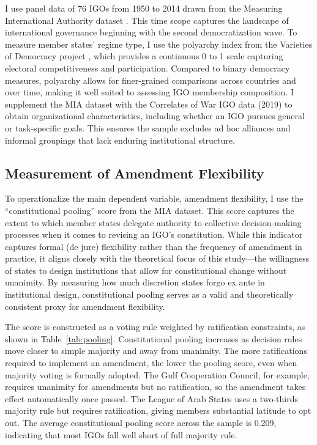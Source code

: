 \documentclass[12pt]{article}
\begin{document}
I use panel data of 76 IGOs from 1950 to 2014 drawn from the Measuring International Authority dataset \parencite{hooghe_constructing_2017}. This time scope captures the landscape of international governance beginning with the second democratization wave. To measure member states' regime type, I use the polyarchy index from the Varieties of Democracy project \parencite{vdem_codebook_2023}, which provides a continuous 0 to 1 scale capturing electoral competitiveness and participation. Compared to binary democracy measures, polyarchy allows for finer-grained comparisons across countries and over time, making it well suited to assessing IGO membership composition. I supplement the MIA dataset with the Correlates of War IGO data (2019) to obtain organizational characteristics, including whether an IGO pursues general or task-specific goals. This ensures the sample excludes ad hoc alliances and informal groupings that lack enduring institutional structure.


\subsection{Measurement of Amendment Flexibility}

To operationalize the main dependent variable, amendment flexibility, I use the ``constitutional pooling'' score from the MIA dataset. This score captures the extent to which member states delegate authority to collective decision-making processes when it comes to revising an IGO's constitution. While this indicator captures formal (de jure) flexibility rather than the frequency of amendment in practice, it aligns closely with the theoretical focus of this study---the willingness of states to design institutions that allow for constitutional change without unanimity. By measuring how much discretion states forgo ex ante in institutional design, constitutional pooling serves as a valid and theoretically consistent proxy for amendment flexibility.

The score is constructed as a voting rule weighted by ratification constraints, as shown in Table~\ref{tab:pooling}. Constitutional pooling increases as decision rules move closer to simple majority and away from unanimity. The more ratifications required to implement an amendment, the lower the pooling score, even when majority voting is formally adopted. The Gulf Cooperation Council, for example, requires unanimity for amendments but no ratification, so the amendment takes effect automatically once passed. The League of Arab States uses a two-thirds majority rule but requires ratification, giving members substantial latitude to opt out. The average constitutional pooling score across the sample is 0.209, indicating that most IGOs fall well short of full majority rule.
\end{document}
